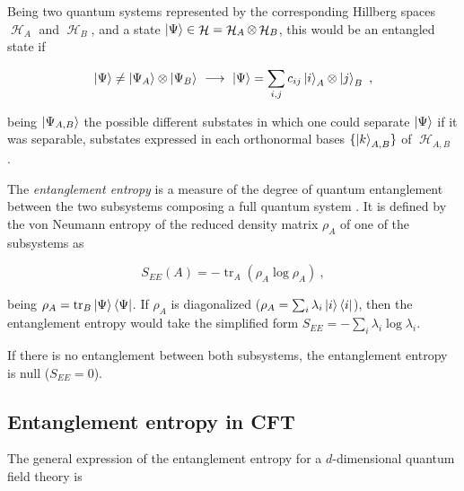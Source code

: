 \documentclass[twocolumn]{revtex4}
\providecommand{\eq}[2]{
    \begin{equation}
        #2
    \label{eq:#1}
    \end{equation}
}
\DeclareMathOperator{\calH}{\mathcal{H}}
\DeclareMathOperator{\tr}{tr}
\begin{document}
Being two quantum systems represented by the corresponding Hillberg spaces $\calH_A$ and $\calH_B$, and a state $\ket{\Psi} \in \calH = \calH_A \otimes \calH_B$, this would be an entangled state if
\eq{entanglement}{
    \ket{\Psi} \neq \ket{\Psi_A} \otimes \ket{\Psi_B} \ \longrightarrow \ \ket{\Psi} = \sum_{i,j} c_{ij} \ket{i}_A \otimes \ket{j}_B \ ,
}
being $\ket{\Psi_{A,B}}$ the possible different substates in which one could separate $\ket{\Psi}$ if it was separable, substates expressed in each orthonormal bases $\{ \ket{k}_{A,B} \}$ of $\calH_{A,B}$ \cite{}.

The \textit{entanglement entropy} is a measure of the degree of quantum entanglement between the two subsystems composing a full quantum system \cite{nishioka_entanglement_2018}. It is defined by the von
Neumann entropy of the reduced density matrix $\rho_A$ of one of the subsystems as
\eq{EE}{
    S_{EE}(A) = - \tr_A ( \rho_A \log \rho_A ) \ ,
}
being $\rho_A = \tr_B \ket{\Psi}\bra{\Psi}$. If $\rho_A$ is diagonalized ($\rho_A = \sum_i \lambda_i \ket{i}\bra{i}$), then the entanglement entropy would take the simplified form $S_{EE} = - \sum_i \lambda_i \log \lambda_i$.

If there is no entanglement between both subsystems, the entanglement entropy is null ($S_{EE} = 0$).


\subsection{Entanglement entropy in CFT} \label{ss:EE_CFT}

The general expression of the entanglement entropy for a $d$-dimensional quantum field theory is
\end{document}
